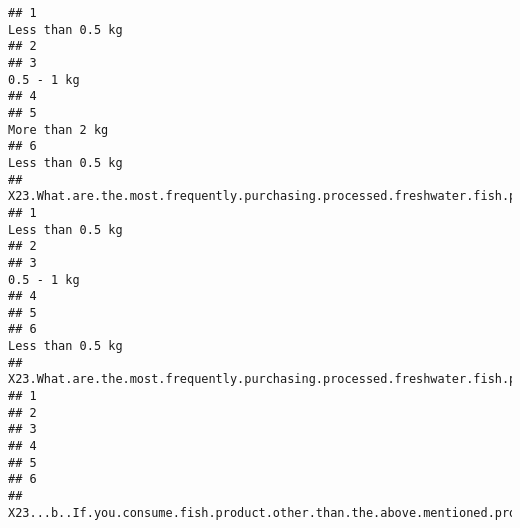 \documentclass[
]{article}
\begin{document}
\begin{verbatim}
## 1                                                                                                         Less than 0.5 kg
## 2                                                                                                                         
## 3                                                                                                               0.5 - 1 kg
## 4                                                                                                                         
## 5                                                                                                           More than 2 kg
## 6                                                                                                         Less than 0.5 kg
##   X23.What.are.the.most.frequently.purchasing.processed.freshwater.fish.products.in.your.household.per.month...Smoked.fish.
## 1                                                                                                          Less than 0.5 kg
## 2                                                                                                                          
## 3                                                                                                                0.5 - 1 kg
## 4                                                                                                                          
## 5                                                                                                                          
## 6                                                                                                          Less than 0.5 kg
##   X23.What.are.the.most.frequently.purchasing.processed.freshwater.fish.products.in.your.household.per.month...Other.
## 1                                                                                                                    
## 2                                                                                                                    
## 3                                                                                                                    
## 4                                                                                                                    
## 5                                                                                                                    
## 6                                                                                                                    
##   X23...b..If.you.consume.fish.product.other.than.the.above.mentioned.processed.product..please.mention.it.here.

\end{verbatim}
\end{document}

